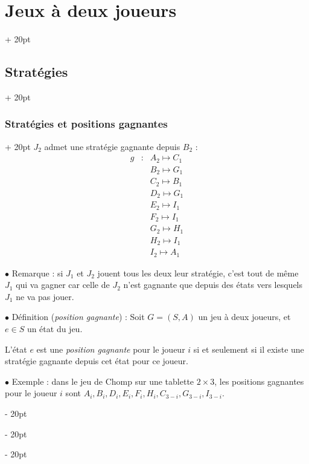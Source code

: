 \documentclass[a4paper, 12pt, twoside]{article}
\newcommand{\ind}[1][20pt]{\advance\leftskip + #1}
\newcommand{\deind}[1][20pt]{\advance\leftskip - #1}
\newenvironment{indt}[2][20pt]{#2 \par \ind[#1]}{\par \deind} %
\begin{document}
\begin{indt}{\section{Jeux à deux joueurs}}
\begin{indt}{\subsection{Stratégies}}
\begin{indt}{\subsubsection{Stratégies et positions gagnantes}}
                $J_2$ admet une stratégie gagnante depuis $B_2$ :
                \[
                    \begin{array}{rcl}
                        g
                        & : & A_2 \longmapsto C_1
                        \\
                        && B_2 \longmapsto G_1
                        \\
                        && C_2 \longmapsto B_1
                        \\
                        && D_2 \longmapsto G_1
                        \\
                        && E_2 \longmapsto I_1
                        \\
                        && F_2 \longmapsto I_1
                        \\
                        && G_2 \longmapsto H_1
                        \\
                        && H_2 \longmapsto I_1
                        \\
                        && I_2 \longmapsto A_1
                    \end{array}
                \]

                \vspace{12pt}
                
                $\bullet$ Remarque : si $J_1$ et $J_2$ jouent tous les deux leur stratégie, c'est tout de même $J_1$ qui va gagner car celle de $J_2$ n'est gagnante que depuis des états vers lesquels $J_1$ ne va pas jouer.

                \vspace{12pt}
                
                $\bullet$ Définition (\emph{position gagnante}) : Soit $G = (S, A)$ un jeu à deux joueurs, et $e \in S$ un état du jeu.

                L'état $e$ est une \emph{position gagnante} pour le joueur $i$ si et seulement si il existe une stratégie gagnante depuis cet état pour ce joueur.

                \vspace{12pt}
                
                $\bullet$ Exemple : dans le jeu de Chomp sur une tablette $2 \times 3$, les positions gagnantes pour le joueur $i$ sont $A_i, B_i, D_i, E_i, F_i, H_i, C_{3 - i}, G_{3 - i}, I_{3 - i}$.

                \vspace{12pt}
                

\end{indt}
\end{indt}
\end{indt}
\end{document}
